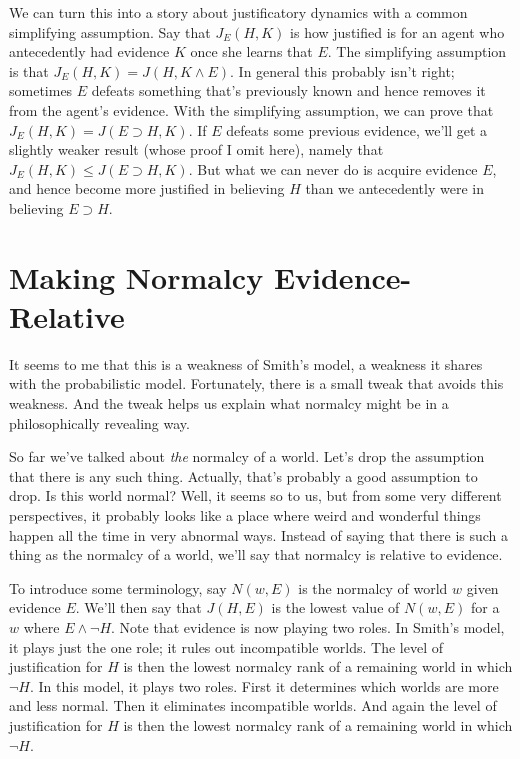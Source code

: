 We can turn this into a story about justificatory dynamics with a common simplifying assumption. Say that $J_E(H, K)$ is how justified is for an agent who antecedently had evidence $K$ once she learns that $E$. The simplifying assumption is that $J_E(H, K) = J(H, K \wedge E)$. In general this probably isn't right; sometimes $E$ defeats something that's previously known and hence removes it from the agent's evidence. With the simplifying assumption, we can prove that $J_E(H, K) = J(E \supset H, K)$. If $E$ defeats some previous evidence, we'll get a slightly weaker result (whose proof I omit here), namely that $J_E(H, K) \leq J(E \supset H, K)$. But what we can never do is acquire evidence $E$, and hence become more justified in believing $H$ than we antecedently were in believing $E \supset H$.

\section{Making Normalcy Evidence-Relative}
\label{makingnormalcyevidence-relative}

It seems to me that this is a weakness of Smith's model, a weakness it shares with the probabilistic model. Fortunately, there is a small tweak that avoids this weakness. And the tweak helps us explain what normalcy might be in a philosophically revealing way.

So far we've talked about \emph{the} normalcy of a world. Let's drop the assumption that there is any such thing. Actually, that's probably a good assumption to drop. Is this world normal? Well, it seems so to us, but from some very different perspectives, it probably looks like a place where weird and wonderful things happen all the time in very abnormal ways. Instead of saying that there is such a thing as the normalcy of a world, we'll say that normalcy is relative to evidence. 

To introduce some terminology, say $N(w, E)$ is the normalcy of world $w$ given evidence $E$. We'll then say that $J(H, E)$ is the lowest value of $N(w, E)$ for a $w$ where $E \wedge \neg H$. Note that evidence is now playing two roles. In Smith's model, it plays just the one role; it rules out incompatible worlds. The level of justification for $H$ is then the lowest normalcy rank of a remaining world in which $\neg H$. In this model, it plays two roles. First it determines which worlds are more and less normal. Then it eliminates incompatible worlds. And again the level of justification for $H$ is then the lowest normalcy rank of a remaining world in which $\neg H$.

